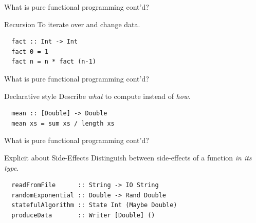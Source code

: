 \documentclass{beamer} %
\begin{document}
\begin{frame}[fragile]{What is pure functional programming cont'd?}
  \begin{block}{Recursion}
 	To iterate over and change data. 
  \end{block}
  
  \begin{block}{}
  \begin{verbatim}
  fact :: Int -> Int
  fact 0 = 1
  fact n = n * fact (n-1)
  \end{verbatim}
  \end{block}
\end{frame}
 
\begin{frame}[fragile]{What is pure functional programming cont'd?}
  \begin{block}{Declarative style}
  	Describe \textit{what} to compute instead of \textit{how}.
  \end{block}
  
  \begin{block}{}
  \begin{verbatim}
  mean :: [Double] -> Double
  mean xs = sum xs / length xs
  \end{verbatim}
  \end{block}
\end{frame}
 
\begin{frame}[fragile]{What is pure functional programming cont'd?}
  \begin{block}{Explicit about Side-Effects}
  	Distinguish between side-effects of a function \textit{in its type}.
  \end{block}
  
  \begin{block}{}
  \begin{verbatim}
  readFromFile      :: String -> IO String
  randomExponential :: Double -> Rand Double
  statefulAlgorithm :: State Int (Maybe Double)
  produceData       :: Writer [Double] ()
  \end{verbatim}
  \end{block}
\end{frame}
\end{document}

